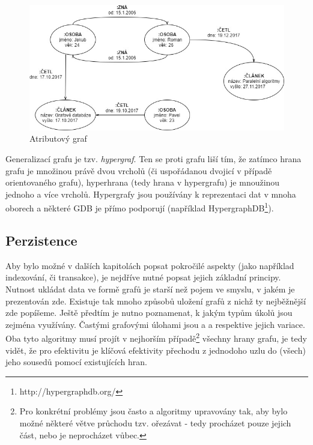 \begin{figure}
\begin{center}
\includegraphics[width=14cm]{figures/property_graph}
\caption{Atributový graf}
\label{fig:property_graf}
\end{center}
\end{figure}

Generalizací grafu je tzv. \textit{hypergraf}. Ten se proti grafu liší tím, že zatímco hrana grafu je množinou právě dvou vrcholů (či uspořádanou dvojicí v případě orientovaného grafu), hyperhrana (tedy hrana v hypergrafu) je mnoužinou jednoho a více vrcholů.\cite{Diestel00} Hypergrafy jsou používány k reprezentaci dat v mnoha oborech a některé GDB je přímo podporují (například HypergraphDB\footnote{http://hypergraphdb.org/}).


\subsection{Perzistence}
Aby bylo možné v dalších kapitolách popsat pokročilé aspekty  (jako například indexování, či transakce), je nejdříve nutné popsat jejich základní principy. Nutnost ukládat data ve formě grafů je starší než pojem  ve smyslu, v jakém je prezentován zde. Existuje tak mnoho způsobů uložení grafů z nichž ty nejběžnější zde popíšeme. Ještě předtím je nutno poznamenat, k jakým typům úkolů jsou  zejména využívány. Častými grafovými úlohami jsou  a  a respektive jejich variace. Oba tyto algoritmy musí projít v nejhorším případě\footnote{Pro konkrétní problémy jsou často  a  algoritmy upravovány tak, aby bylo možné některé větve průchodu tzv. ořezávat - tedy procházet pouze jejich část, nebo je neprocházet vůbec.} všechny hrany grafu, je tedy vidět, že pro efektivitu  je klíčová efektivity přechodu z jednodoho uzlu do (všech) jeho sousedů pomocí existujících hran.

